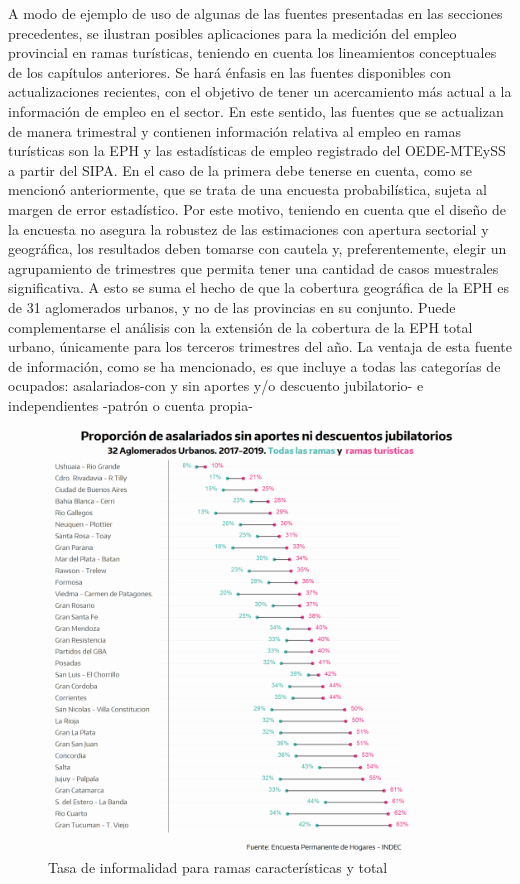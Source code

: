 \documentclass[
  openany]{book}
\begin{document}
A modo de ejemplo de uso de algunas de las fuentes presentadas en las secciones precedentes, se ilustran posibles aplicaciones para la medición del empleo provincial en ramas turísticas, teniendo en cuenta los lineamientos conceptuales de los capítulos anteriores. Se hará énfasis en las fuentes disponibles con actualizaciones recientes, con el objetivo de tener un acercamiento más actual a la información de empleo en el sector. En este sentido, las fuentes que se actualizan de manera trimestral y contienen información relativa al empleo en ramas turísticas son la EPH y las estadísticas de empleo registrado del OEDE-MTEySS a partir del SIPA. En el caso de la primera debe tenerse en cuenta, como se mencionó anteriormente, que se trata de una encuesta probabilística, sujeta al margen de error estadístico. Por este motivo, teniendo en cuenta que el diseño de la encuesta no asegura la robustez de las estimaciones con apertura sectorial y geográfica, los resultados deben tomarse con cautela y, preferentemente, elegir un agrupamiento de trimestres que permita tener una cantidad de casos muestrales significativa. A esto se suma el hecho de que la cobertura geográfica de la EPH es de 31 aglomerados urbanos, y no de las provincias en su conjunto. Puede complementarse el análisis con la extensión de la cobertura de la EPH total urbano, únicamente para los terceros trimestres del año. La ventaja de esta fuente de información, como se ha mencionado, es que incluye a todas las categorías de ocupados: asalariados-con y sin aportes y/o descuento jubilatorio- e independientes -patrón o cuenta propia-

\begin{figure}

{\centering \includegraphics[width=1\linewidth]{imagenes/empleo eph} 

}

\caption{Tasa de informalidad para ramas características y total}\label{fig:empleoeph}
\end{figure}
\end{document}
